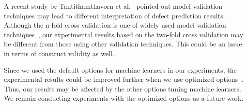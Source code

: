 A recent study by Tantithamthavorn et al.~\cite{Tantithamthavorn16} pointed out model validation techniques may lead to different interpretation of defect prediction results. Although the n-fold cross validation is one of widely used model validation techniques~\cite{Klas2010,Nam13,Pinzger2008}, our experimental results based on the two-fold cross validation may be different from those using other validation techniques. This could be an issue in terms of construct validity as well.

Since we used the default options for machine learners in our experiments, the experimental results could be improved further when we use optimized options~\cite{Tantithamthavorn16icse,Fu2016}. Thus, our results may be affected by the other options tuning machine learners. We remain conducting experiments with the optimized options as a future work. 
	

